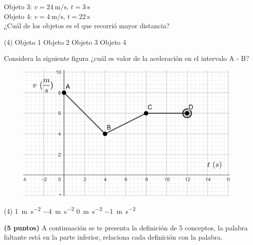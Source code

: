\documentclass[12pt, letter]{exam}
\begin{document}
\begin{questions}
    Objeto 3: $v = \SI{24}{\meter\per\second}, \, t = \SI{3}{\second}$ \\
    Objeto 4: $v = \SI{4}{\meter\per\second}, \, t = \SI{22}{\second}$ \\[0.3em]
    ¿Cuál de los objetos es el que recorrió mayor distancia? 
    \begin{tasks}(4)
        \task Objeto 1
        \task Objeto 2
        \task Objeto 3
        \task Objeto 4        
    \end{tasks}
    \question Considera la siguiente figura ¿cuál es valor de la aceleración en el intervalo A - B?
    \begin{figure}[H]
        \centering
        \includegraphics[scale=1.5]{Imagenes/Examen_Grafica_02.png}
    \end{figure}
    \begin{tasks}(4)
        \task \SI{1}{\meter\per\square\second}
        \task \SI{-4}{\meter\per\square\second}
        \task \SI{0}{\meter\per\square\second}
        \task \SI{-1}{\meter\per\square\second}
    \end{tasks}
    \question \textbf{(5 puntos)} A continuación se te presenta la definición de 5 conceptos, la palabra faltante está en la parte inferior, relaciona cada definición con la palabra.
\end{questions}
\end{document}
